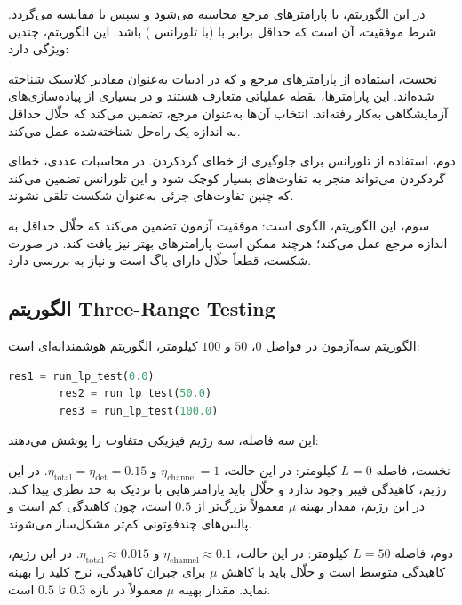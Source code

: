 در این الگوریتم،  با پارامترهای مرجع محاسبه می‌شود و سپس با  مقایسه می‌گردد. شرط موفقیت، آن است که  حداقل برابر با  (با تلورانس ) باشد. این الگوریتم، چندین ویژگی دارد:

نخست، استفاده از پارامترهای مرجع  و  که در ادبیات  به‌عنوان مقادیر کلاسیک شناخته شده‌اند. این پارامترها، نقطه عملیاتی متعارف هستند و در بسیاری از پیاده‌سازی‌های آزمایشگاهی به‌کار رفته‌اند. انتخاب آن‌ها به‌عنوان مرجع، تضمین می‌کند که حلّال حداقل به اندازه یک راه‌حل شناخته‌شده عمل می‌کند.

دوم، استفاده از تلورانس  برای جلوگیری از خطای گردکردن. در محاسبات عددی، خطای گردکردن می‌تواند منجر به تفاوت‌های بسیار کوچک شود و این تلورانس تضمین می‌کند که چنین تفاوت‌های جزئی به‌عنوان شکست تلقی نشوند.

سوم، این الگوریتم، الگوی  است: موفقیت آزمون تضمین می‌کند که حلّال حداقل به اندازه مرجع عمل می‌کند؛ هرچند ممکن است پارامترهای بهتر نیز یافت کند. در صورت شکست، قطعاً حلّال دارای باگ است و نیاز به بررسی دارد.

\subsection{الگوریتم Three-Range Testing}

الگوریتم سه‌آزمون در فواصل $0$، $50$ و $100$ کیلومتر، الگوریتم هوشمندانه‌ای است:

\begin{LTR}
	\begin{lstlisting}[language=Python]
		res1 = run_lp_test(0.0)
		res2 = run_lp_test(50.0)
		res3 = run_lp_test(100.0)
	\end{lstlisting}
\end{LTR}

این سه فاصله، سه رژیم فیزیکی متفاوت را پوشش می‌دهند:

نخست، فاصله $L = 0$ کیلومتر: در این حالت، $\eta_{\text{channel}} = 1$ و $\eta_{\text{total}} = \eta_{\text{det}} = 0.15$. در این رژیم، کاهیدگی فیبر وجود ندارد و حلّال باید پارامترهایی با  نزدیک به حد نظری پیدا کند. در این رژیم، مقدار بهینه $\mu$ معمولاً بزرگ‌تر از $0.5$ است، چون کاهیدگی کم است و پالس‌های چندفوتونی کم‌تر مشکل‌ساز می‌شوند.

دوم، فاصله $L = 50$ کیلومتر: در این حالت، $\eta_{\text{channel}} \approx 0.1$ و $\eta_{\text{total}} \approx 0.015$. در این رژیم، کاهیدگی متوسط است و حلّال باید با کاهش $\mu$ برای جبران کاهیدگی، نرخ کلید را بهینه نماید. مقدار بهینه $\mu$ معمولاً در بازه $0.3$ تا $0.5$ است.

